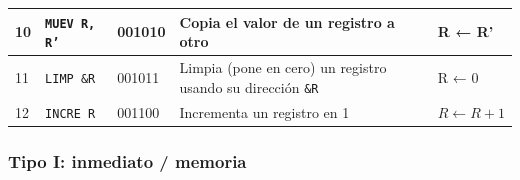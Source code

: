 \documentclass{article}
\begin{document}
\begin{longtable}{|p{}|p{}|p{}|p{}|p{}|}
  \hline
  10              & \texttt{MUEV R, R'}         & 001010                          & Copia el valor de un registro a otro                               & R ← R'                                     \\
  \hline
  11              & \texttt{LIMP \&R}           & 001011                          & Limpia (pone en cero) un registro usando su dirección \texttt{\&R} & R ← 0                                      \\
  \hline
  12              & \texttt{INCRE R}            & 001100                          & Incrementa un registro en 1                                        & $R \leftarrow R + 1$                       \\
  \hline
\end{longtable}

\subsubsection{Tipo I: \textbf{inmediato / memoria}}
\end{document}
